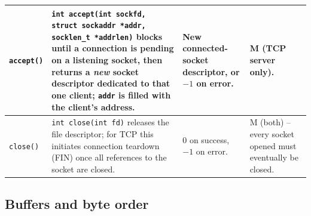 \documentclass[11pt,a4paper]{article}
\begin{document}
\begin{longtable}{|p{2.6cm}|p{6.6cm}|p{2cm}|p{3.6cm}|}
\texttt{accept()} &
\texttt{int accept(int sockfd, struct sockaddr *addr, socklen\_t *addrlen)} blocks until a
connection is pending on a listening socket, then returns a \emph{new} socket descriptor
dedicated to that one client; \texttt{addr} is filled with the client's address. &
New connected-socket descriptor, or $-1$ on error. &
M (TCP server only). \\ \hline

\texttt{close()} &
\texttt{int close(int fd)} releases the file descriptor; for TCP this initiates connection
teardown (FIN) once all references to the socket are closed. &
$0$ on success, $-1$ on error. &
M (both) -- every socket opened must eventually be closed. \\ \hline

\end{longtable}

\subsection{Buffers and byte order}
\end{document}

